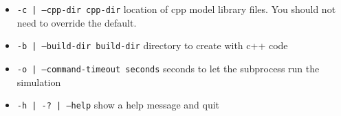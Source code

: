 \documentclass{article}
\newcommand{\inlinecode}[1]{\texttt{#1}}
\begin{document}
\begin{itemize}
\item \inlinecode{-c | --cpp-dir cpp-dir}
  location of cpp model library files.  You should not need to override the default.
\item \inlinecode{-b | --build-dir build-dir}
  directory to create with c++ code
\item \inlinecode{-o | --command-timeout seconds}
  seconds to let the subprocess run the simulation
\item \inlinecode{-h | -? | --help}
  show a help message and quit
\end{itemize}
\end{document}
